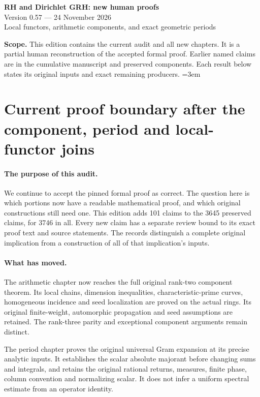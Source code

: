 \documentclass[11pt,a4paper]{article}
\numberwithin{equation}{section}
\theoremstyle{remark}\newtheorem{remark}[theorem]{Remark}
\begin{document}
\begin{center}
{\LARGE\bfseries RH and Dirichlet GRH: new human proofs}\\[7pt]
{\large Version 0.57 --- 24 November 2026}\\[5pt]
{\large Local functors, arithmetic components, and exact geometric periods}
\end{center}
\textbf{Scope.} This edition contains the current audit and all new chapters.
It is a partial human reconstruction of the accepted formal proof.
Earlier named claims are in the cumulative manuscript and preserved components.
Each result below states its original inputs and exact remaining producers.
\setcounter{tocdepth}{1}
\tableofcontents
\clearpage
\begingroup\emergencystretch=3em
\section{Current proof boundary after the component, period and local-functor joins}
\label{sec:dependency-audit-v57}

\paragraph{The purpose of this audit.}
We continue to accept the pinned formal proof as correct.  The question
here is which portions now have a readable mathematical proof, and which
original constructions still need one.  This edition adds 101 claims
to the 3645 preserved claims, for 3746 in all.  Every new claim has
a separate review bound to its exact proof text and source statements.
The records distinguish a complete original implication from a construction
of all of that implication's inputs.

\paragraph{What has moved.}
The arithmetic chapter now reaches the full original rank-two component
theorem.  Its local chains, dimension inequalities, characteristic-prime
curves, homogeneous incidence and seed localization are proved on the
actual rings.  Its original finite-weight, automorphic propagation and
seed assumptions are retained.  The rank-three parity and exceptional
component arguments remain distinct.

The period chapter proves the original universal Gram expansion at its
precise analytic inputs.  It establishes the scalar absolute majorant
before changing sums and integrals, and retains the original rational
returns, measures, finite phase, column convention and normalizing scalar.
It does not infer a uniform spectral estimate from an operator identity.
\end{document}
